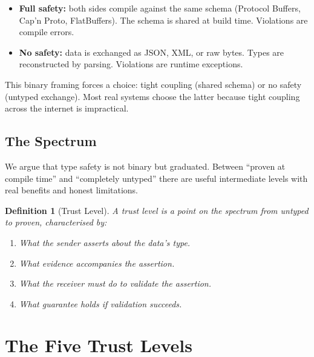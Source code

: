 \documentclass[11pt,a4paper]{article}
\newtheorem{definition}{Definition}
\begin{document}
\begin{itemize}
\item \textbf{Full safety:} both sides compile against the same schema
  (Protocol Buffers, Cap'n Proto, FlatBuffers). The schema is shared at
  build time. Violations are compile errors.
\item \textbf{No safety:} data is exchanged as JSON, XML, or raw bytes.
  Types are reconstructed by parsing. Violations are runtime exceptions.
\end{itemize}

This binary framing forces a choice: tight coupling (shared schema) or
no safety (untyped exchange). Most real systems choose the latter because
tight coupling across the internet is impractical.

\subsection{The Spectrum}

We argue that type safety is not binary but graduated. Between ``proven
at compile time'' and ``completely untyped'' there are useful
intermediate levels with real benefits and honest limitations.

\begin{definition}[Trust Level]
A \emph{trust level} is a point on the spectrum from untyped to proven,
characterised by:
\begin{enumerate}
\item What the sender asserts about the data's type.
\item What evidence accompanies the assertion.
\item What the receiver must do to validate the assertion.
\item What guarantee holds if validation succeeds.
\end{enumerate}
\end{definition}

\section{The Five Trust Levels}
\end{document}
